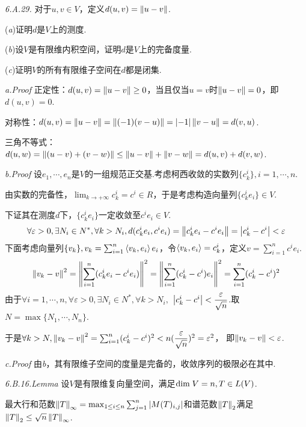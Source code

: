 \textit{6.A.29.}
对于\(u,v \in V\)，定义\(d(u,v)=\left\lVert u-v \right\rVert\).

(\textit{a})证明\(d\)是\(V\)上的测度.

(\textit{b})设\(V\)是有限维内积空间，证明\(d\)是\(V\)上的完备度量.

(\textit{c})证明\(V\)的所有有限维子空间在\(d\)都是闭集.

\textit{a.Proof}
正定性：\(d(u,v)=\left\lVert u-v \right\rVert \geq 0\)，当且仅当\(u=v\)时\(\left\lVert u-v \right\rVert=0\)，即\(d(u,v)=0\).

对称性：\(d(u,v)=\left\lVert u-v \right\rVert=\left\lVert (-1)(v-u) \right\rVert=\left\lvert -1 \right\rvert\left\lVert v-u \right\rVert=d(v,u)\).

三角不等式：\(d(u,w)=\left\lVert (u-v)+(v-w) \right\rVert \leq \left\lVert u-v \right\rVert+\left\lVert v-w \right\rVert=d(u,v)+d(v,w)\).

\textit{b.Proof}
设\(e_1,\cdots,e_n\)是\(V\)的一组规范正交基.考虑柯西收敛的实数列\(\{c_k^i\},i=1,\cdots,n\).

由实数的完备性，\(\lim_{k \rightarrow +\infty}c_k^i=c^i \in R\)，于是考虑构造向量列\(\{c_k^ie_i\} \in V\).

下证其在测度\(d\)下，\(\{c_k^ie_i\}\)一定收敛至\(c^ie_i \in V\).
    \begin{align*}
        \forall \varepsilon>0,\exists N_i \in N^*,\forall k>N_i,
        d(c_k^ie_i,c^ie_i)=\left\lVert c_k^ie_i-c^ie_i \right\rVert=\left\lvert c_k^i-c^i \right\rvert<\varepsilon
    \end{align*}
下面考虑向量列\(\{v_k\},v_k=\sum_{i=1}^n \left\langle v_k,e_i \right\rangle e_i\)，令\(\left\langle v_k,e_i \right\rangle=c_k^i\)，定义\(v=\sum_{i=1}^n c^ie_i\).
    \begin{align*}
        \left\lVert v_k-v \right\rVert^2=\left\lVert \sum_{i=1}^n(c_k^ie_i-c^ie_i) \right\rVert^2=\left\lVert \sum_{i=1}^n(c_k^i-c^i)e_i \right\rVert^2
        =\sum_{i=1}^n(c_k^i-c^i)^2
    \end{align*}
由于\(\forall i=1,\cdots,n,\forall \varepsilon>0,\exists N_i \in N^*,\forall k>N_i,\)
\(\left\lvert c_k^i-c^i \right\rvert<\dfrac{\varepsilon}{\sqrt{n}}\).取\(N=\max\{N_1,\cdots,N_n\}\).

于是\(\forall k>N,\left\lVert v_k-v \right\rVert^2=\sum_{i=1}^n(c_k^i-c^i)^2<n(\dfrac{\varepsilon}{\sqrt{n}})^2=\varepsilon^2\)，
即\(\left\lVert v_k-v \right\rVert<\varepsilon\).

\textit{c.Proof}
由\textit{b}，其有限维子空间的度量是完备的，收敛序列的极限必在其中.

\hspace*{\fill}

\textit{6.B.16.Lemma}
设\(V\)是有限维复向量空间，满足\(\mathrm{dim \;} V=n,T \in L(V)\).

最大行和范数\(\left\lVert T \right\rVert_{\infty}=\max_{1 \leq i \leq n} \sum_{j=1}^n \left\lvert M(T)_{i,j} \right\rvert\)和谱范数\(\left\lVert T \right\rVert_2\)满足
\(\left\lVert T \right\rVert_2 \leq \sqrt{n}\left\lVert T \right\rVert_{\infty}\).

